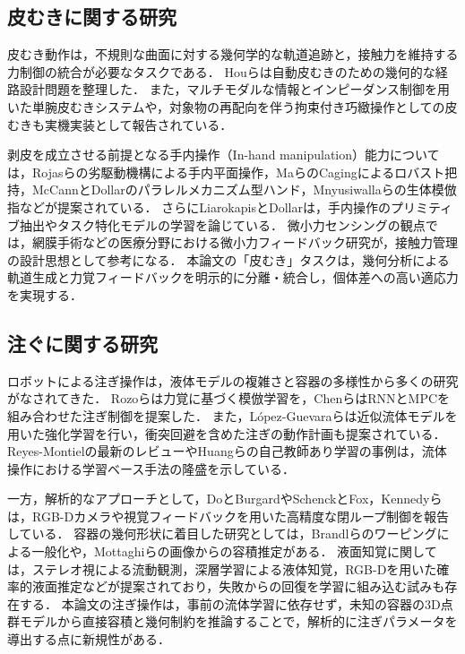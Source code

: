 \subsection{皮むきに関する研究}
皮むき動作は，不規則な曲面に対する幾何学的な軌道追跡と，接触力を維持する力制御の統合が必要なタスクである．
Houら\cite{Hou2022PeelingPlanning}は自動皮むきのための幾何的な経路設計問題を整理した．
また，マルチモダルな情報とインピーダンス制御を用いた単腕皮むきシステム\cite{Arxiv2024MultimodalPeeling}や，対象物の再配向を伴う拘束付き巧緻操作としての皮むき\cite{Arxiv2024ConstrainedDexterousPeeling}も実機実装として報告されている．

剥皮を成立させる前提となる手内操作（In-hand manipulation）能力については，Rojasら\cite{Rojas2016GR2}の劣駆動機構による手内平面操作，Maら\cite{Ma2017WholeHandCaging}のCagingによるロバスト把持，McCannとDollar\cite{McCann2017StewartHand}のパラレルメカニズム型ハンド，Mnyusiwallaら\cite{Mnyusiwalla2016BioInspiredInsideHand}の生体模倣指などが提案されている．
さらにLiarokapisとDollarは，手内操作のプリミティブ抽出\cite{Liarokapis2017Primitives}やタスク特化モデルの学習\cite{Liarokapis2016TaskSpecificModels}を論じている．
微小力センシングの観点では，網膜手術などの医療分野における微小力フィードバック研究\cite{Balicki2010MicroForcePeeling}が，接触力管理の設計思想として参考になる．
本論文の「皮むき」タスクは，幾何分析による軌道生成と力覚フィードバックを明示的に分離・統合し，個体差への高い適応力を実現する．

\subsection{注ぐに関する研究}
ロボットによる注ぎ操作は，液体モデルの複雑さと容器の多様性から多くの研究がなされてきた．
Rozoら\cite{Rozo2013PouringForceBased}は力覚に基づく模倣学習を，Chenら\cite{Chen2019RNNMPCPouring}はRNNとMPCを組み合わせた注ぎ制御を提案した．
また，López-Guevaraら\cite{LopezGuevara2017NotToSpill}は近似流体モデルを用いた強化学習を行い，衝突回避を含めた注ぎの動作計画\cite{AAAI2023PouringPlanning}も提案されている．
Reyes-Montiel\cite{ReyesMontiel2026PouringReview}の最新のレビューやHuangら\cite{Huang2021SelfSupervisedPouring}の自己教師あり学習の事例は，流体操作における学習ベース手法の隆盛を示している．

一方，解析的なアプローチとして，DoとBurgard\cite{DoBurgard2018AccuratePouring}やSchenckとFox\cite{SchenckFox2017ClosedLoopPouring}，Kennedyら\cite{Kennedy2017Dispensing}は，RGB-Dカメラや視覚フィードバックを用いた高精度な閉ループ制御を報告している．
容器の幾何形状に着目した研究としては，Brandlら\cite{Brandl2014WarpedPouring}のワーピングによる一般化や，Mottaghiら\cite{Mottaghi2017GlassHalfFull}の画像からの容積推定がある．
液面知覚に関しては，ステレオ視による流動観測\cite{YamaguchiAtkeson2016StereoFlow}，深層学習による液体知覚\cite{SchenckFox2016LiquidsISER}，RGB-Dを用いた確率的液面推定\cite{Do2016ProbLiquidLevel}などが提案されており，失敗からの回復を学習に組み込む試み\cite{Langsfeld2014FailureToSuccessPouring}も存在する．
本論文の注ぎ操作は，事前の流体学習に依存せず，未知の容器の3D点群モデルから直接容積と幾何制約を推論することで，解析的に注ぎパラメータを導出する点に新規性がある．


